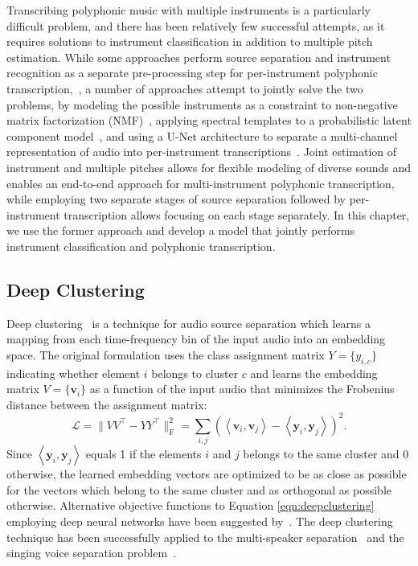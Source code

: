 Transcribing polyphonic music with multiple instruments is a particularly difficult problem, and there has been relatively few successful attempts, as it requires solutions to instrument classification in addition to multiple pitch estimation.
While some approaches perform source separation and instrument recognition as a separate pre-processing step for per-instrument polyphonic transcription,~\cite{heittola2009separation,itoyama2011bayesian}, a number of approaches attempt to jointly solve the two problems, by modeling the possible instruments as a constraint to non-negative matrix factorization (NMF)~\cite{grindlay2009eigeninstruments}, applying spectral templates to a probabilistic latent component model~\cite{benetos2015probabilistic}, and using a U-Net architecture to separate a multi-channel representation of audio into per-instrument transcriptions~\cite{wu2019musicnet}.
Joint estimation of instrument and multiple pitches allows for flexible modeling of diverse sounds and enables an end-to-end approach for multi-instrument polyphonic transcription, while employing two separate stages of source separation followed by per-instrument transcription allows focusing on each stage separately.
In this chapter, we use the former approach and develop a model that jointly performs instrument classification and polyphonic transcription.


\subsection{Deep Clustering}

Deep clustering~\cite{hershey2016deepclustering} is a technique for audio source separation which learns a mapping from each time-frequency bin of the input audio into an embedding space.
The original formulation uses the class assignment matrix $Y = \{ y_{i,c} \}$ indicating whether element $i$ belongs to cluster $c$ and learns the embedding matrix $V = \{ \mathbf{v}_{i} \}$ as a function of the input audio that minimizes the Frobenius distance between the assignment matrix:
\begin{equation}\label{eqn:deepclustering}
\mathcal{L} = \lVert VV^\top - YY^\top \rVert_{\mathrm{F}}^2 = \sum_{i, j} \left ( \left < \mathbf{v}_i, \mathbf{v}_j \right > - \left < \mathbf{y}_i, \mathbf{y}_j \right > \right )^2.
\end{equation}
Since $\left < \mathbf{y}_i, \mathbf{y}_j \right >$ equals 1 if the elements $i$ and $j$ belongs to the same cluster and 0 otherwise, the learned embedding vectors are optimized to be as close as possible for the vectors which belong to the same cluster and as orthogonal as possible otherwise.
Alternative objective functions to Equation \ref{eqn:deepclustering} employing deep neural networks have been suggested by~\cite{wang2018deepclustering}.
The deep clustering technique has been successfully applied to the multi-speaker separation~\cite{isik2016deepclustering} and the singing voice separation problem~\cite{luo2017deepclustering}.

